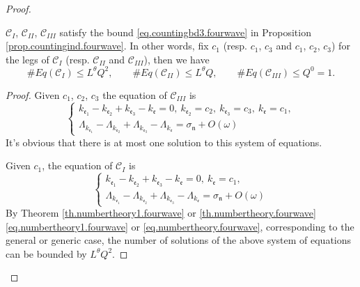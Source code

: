 \begin{proof}
     
    \begin{lem}\label{lem.countingbdunit.fourwave}
    $\mathcal{C}_{I}$, $\mathcal{C}_{II}$, $\mathcal{C}_{III}$ satisfy the bound \eqref{eq.countingbd3.fourwave} in Proposition \ref{prop.countingind.fourwave}. In other words, fix $c_1$ (resp. $c_1$, $c_3$ and $c_1$, $c_2$, $c_3$) for the legs of $\mathcal{C}_{I}$ (resp. $\mathcal{C}_{II}$ and $\mathcal{C}_{III}$), then we have 
    \begin{equation}\label{eq.countingbdunit.fourwave}
     \# Eq(\mathcal{C}_{I})\leq L^\theta Q^{2},\qquad \# Eq(\mathcal{C}_{II})\leq L^\theta Q,\qquad \# Eq(\mathcal{C}_{III})\leq Q^0=1.
    \end{equation}
    \end{lem}
    \begin{proof} Given $c_1$, $c_2$, $c_3$ the equation of $\mathcal{C}_{III}$ is 
     \begin{equation}
     \begin{cases}
     k_{\mathfrak{e}_1}-k_{\mathfrak{e}_2}+k_{\mathfrak{e}_3}-k_{\mathfrak{e}}=0,\ k_{\mathfrak{e}_2}=c_2,\ k_{\mathfrak{e}_3}=c_3,\ k_{\mathfrak{e}}=c_1,
     \\
     \Lambda_{k_{\mathfrak{e}_1}}-\Lambda_{k_{\mathfrak{e}_2}}+\Lambda_{k_{\mathfrak{e}_3}}-\Lambda_{k_{\mathfrak{e}}}=\sigma_{\mathfrak{n}}+O(\omega)
     \end{cases}
     \end{equation}
     It's obvious that there is at most one solution to this system of equations.
     
     Given $c_1$, the equation of $\mathcal{C}_{I}$ is 
     \begin{equation}
     \begin{cases}
     k_{\mathfrak{e}_1}-k_{\mathfrak{e}_2}+k_{\mathfrak{e}_3}-k_{\mathfrak{e}}=0,\ k_{\mathfrak{e}}=c_1,
     \\
     \Lambda_{k_{\mathfrak{e}_1}}-\Lambda_{k_{\mathfrak{e}_2}}+\Lambda_{k_{\mathfrak{e}_3}}-\Lambda_{k_{\mathfrak{e}}}=\sigma_{\mathfrak{n}}+O(\omega)
     \end{cases}
     \end{equation}
     By Theorem \ref{th.numbertheory1.fourwave} or \ref{th.numbertheory.fourwave} \eqref{eq.numbertheory1.fourwave} or \eqref{eq.numbertheory.fourwave}, corresponding to the general or generic case, the number of solutions of the above system of equations can be bounded by $ L^\theta Q^2$.
    

\end{proof}
\end{proof}
